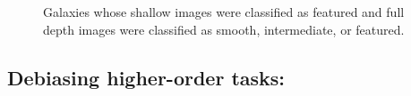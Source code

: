 \documentclass[twocolumn]{aastex6}
\begin{document}
\begin{figure}
\centering





\caption{Galaxies whose shallow images were classified as featured and full depth images were classified as smooth, intermediate, or featured.}
\label{fig:shallow_featured}
\end{figure}

\subsection{Debiasing higher-order tasks: \fbar}
\label{sec:ferengi_bar}
\end{document}
